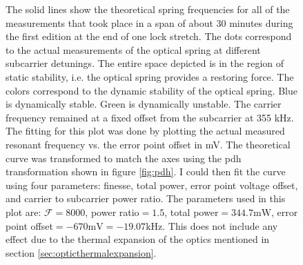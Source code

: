 \begin{figure}
    \caption[Parameters from the 1st Edition]{
      The solid lines show the theoretical
      spring frequencies for all of the measurements that took place in a span
      of about 30 minutes during the first edition at the end of one lock
      stretch.
      The dots correspond to the actual measurements of the optical spring at
      different subcarrier detunings. The entire space depicted is in the region
      of static stability, i.e. the optical spring provides a restoring force.
      The colors correspond to the dynamic stability of the optical spring.
      Blue is dynamically stable.
      Green is dynamically unstable.
      The carrier frequency remained at a fixed offset from the subcarrier at
      355 kHz.
      The fitting for this plot was done by plotting the actual measured
      resonant frequency vs. the error point offset in mV.
      The theoretical curve was transformed to match the axes using the
      \ac{pdh} transformation shown in figure \ref{fig:pdh}.
      I could then fit the curve using four parameters:
      finesse, total power, error point voltage offset,
      and carrier to subcarrier power ratio.
      The parameters used in this plot are:
      $\mathcal{F}=8000$, power ratio$=1.5$, total power$=344.7\mathrm{mW}$,
      error point offset$=-670\mathrm{mV}=-19.07\mathrm{kHz}$.
      This does not include any effect due to the thermal expansion of the
      optics mentioned in section \ref{sec:opticthermalexpansion}.
      }
  \label{fig:april_space1}
\end{figure}

